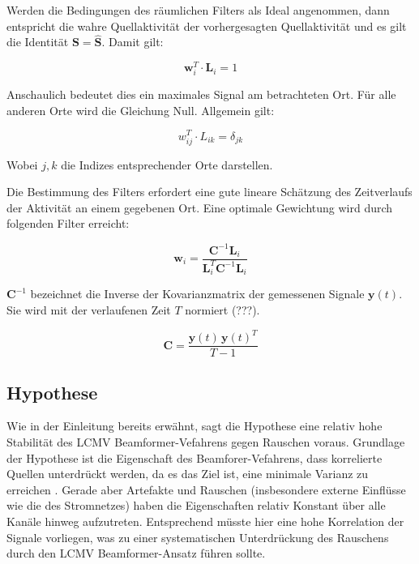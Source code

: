 \documentclass[doc,a4paper,12pt]{apa6}
\newcommand{\mx}[1]{\mathbf{#1}}
\begin{document}
Werden die Bedingungen des räumlichen Filters als Ideal angenommen, dann entspricht die wahre Quellaktivität der vorhergesagten Quellaktivität und es gilt die Identität $\mx{S} = \mx{\hat S}$. Damit gilt:

\begin{equation}
\mx{w}_i^T \cdot \mx{L}_i = 1
\end{equation}

Anschaulich bedeutet dies ein maximales Signal am betrachteten Ort. Für alle anderen Orte wird die Gleichung Null. Allgemein gilt:

\begin{equation}
w^T_{ij} \cdot L_{ik} = \delta_{jk}
\end{equation}

Wobei $j,k$ die Indizes entsprechender Orte darstellen.

Die Bestimmung des Filters erfordert eine gute lineare Schätzung des Zeitverlaufs der Aktivität an einem gegebenen Ort. Eine optimale Gewichtung \parencite[z.B.][]{haykin2008adaptive} wird durch folgenden Filter erreicht:

\begin{equation}
\mx{w}_i = \frac{\mx{C}^{-1} \mx{L}_i}{\mx{L}^T_i \mx{C}^{-1} \mx{L}_i}
\end{equation}

$\mx{C}^{-1}$ bezeichnet die Inverse der Kovarianzmatrix der gemessenen Signale $\mx{y}(t)$. Sie wird mit der verlaufenen Zeit $T$ normiert (???).

\begin{equation}
\mx{C} = \frac{\mx{y}(t)\,\mx{y}(t)^T}{T-1}
\end{equation}

\subsection{Hypothese}
\label{sec:hypo}

Wie in der Einleitung bereits erwähnt, sagt die Hypothese eine relativ hohe Stabilität des LCMV Beamformer-Vefahrens gegen Rauschen voraus. Grundlage der Hypothese ist die Eigenschaft des Beamforer-Vefahrens, dass korrelierte Quellen unterdrückt werden, da es das Ziel ist, eine minimale Varianz zu erreichen \parencite{van1997localization}. Gerade aber Artefakte und Rauschen (insbesondere externe Einflüsse wie die des Stromnetzes) haben die Eigenschaften relativ Konstant über alle Kanäle hinweg aufzutreten. Entsprechend müsste hier eine hohe Korrelation der Signale vorliegen, was zu einer systematischen Unterdrückung des Rauschens durch den LCMV Beamformer-Ansatz führen sollte.
\end{document}
